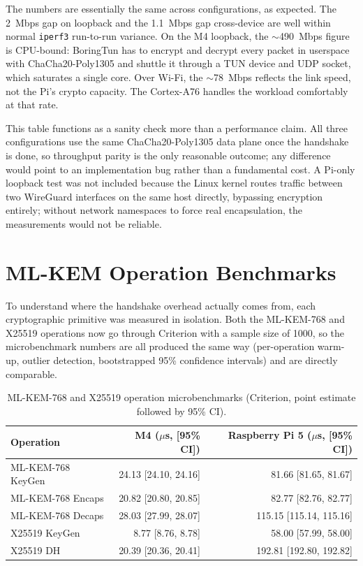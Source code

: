 The numbers are essentially the same across configurations, as expected. The 2~Mbps gap on loopback and the 1.1~Mbps gap cross-device are well within normal \texttt{iperf3} run-to-run variance. On the M4 loopback, the $\sim$490~Mbps figure is CPU-bound: BoringTun has to encrypt and decrypt every packet in userspace with ChaCha20-Poly1305 and shuttle it through a TUN device and UDP socket, which saturates a single core. Over Wi-Fi, the $\sim$78~Mbps reflects the link speed, not the Pi's crypto capacity. The Cortex-A76 handles the workload comfortably at that rate.

This table functions as a sanity check more than a performance claim. All three configurations use the same ChaCha20-Poly1305 data plane once the handshake is done, so throughput parity is the only reasonable outcome; any difference would point to an implementation bug rather than a fundamental cost. A Pi-only loopback test was not included because the Linux kernel routes traffic between two WireGuard interfaces on the same host directly, bypassing encryption entirely; without network namespaces to force real encapsulation, the measurements would not be reliable.

\section{ML-KEM Operation Benchmarks}

To understand where the handshake overhead actually comes from, each cryptographic primitive was measured in isolation. Both the ML-KEM-768 and X25519 operations now go through Criterion with a sample size of 1000, so the microbenchmark numbers are all produced the same way (per-operation warm-up, outlier detection, bootstrapped 95\% confidence intervals) and are directly comparable.

\begin{table}[H]
\centering
\caption{ML-KEM-768 and X25519 operation microbenchmarks (Criterion, point estimate followed by 95\% CI).}
\label{tab:mlkem_benchmarks}
\begin{tabular}{@{}lrr@{}}
\toprule
\textbf{Operation} & \textbf{M4 ($\mu$s, [95\% CI])} & \textbf{Raspberry Pi 5 ($\mu$s, [95\% CI])} \\
\midrule
ML-KEM-768 KeyGen & 24.13 [24.10, 24.16] & 81.66 [81.65, 81.67]    \\
ML-KEM-768 Encaps & 20.82 [20.80, 20.85] & 82.77 [82.76, 82.77]    \\
ML-KEM-768 Decaps & 28.03 [27.99, 28.07] & 115.15 [115.14, 115.16] \\
\midrule
X25519 KeyGen     & 8.77 [8.76, 8.78]    & 58.00 [57.99, 58.00]    \\
X25519 DH         & 20.39 [20.36, 20.41] & 192.81 [192.80, 192.82] \\
\bottomrule
\end{tabular}
\end{table}

